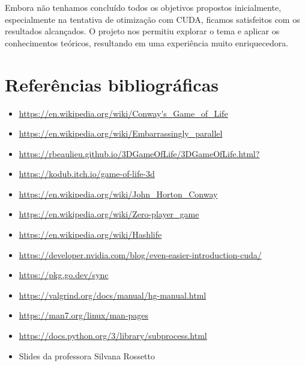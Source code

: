 \documentclass[14]{article}
\begin{document}
Embora não tenhamos concluído todos os objetivos propostos inicialmente, especialmente na tentativa de otimização com CUDA, ficamos satisfeitos com os resultados alcançados. O projeto nos permitiu explorar o tema e aplicar os conhecimentos teóricos, resultando em uma experiência muito enriquecedora.


\section{Referências bibliográficas}
   
    \begin{itemize}
        \item \url{https://en.wikipedia.org/wiki/Conway's_Game_of_Life}
        \item \url{https://en.wikipedia.org/wiki/Embarrassingly_parallel}
        \item \url{https://rbeaulieu.github.io/3DGameOfLife/3DGameOfLife.html?}
        \item \url{https://kodub.itch.io/game-of-life-3d}
        \item \url{https://en.wikipedia.org/wiki/John_Horton_Conway}
        \item \url{https://en.wikipedia.org/wiki/Zero-player_game}
        \item \url{https://en.wikipedia.org/wiki/Hashlife}
        \item \url{https://developer.nvidia.com/blog/even-easier-introduction-cuda/}
        \item \url{https://pkg.go.dev/sync}
        \item \url{https://valgrind.org/docs/manual/hg-manual.html}
        \item \url{https://man7.org/linux/man-pages}
        \item \url{https://docs.python.org/3/library/subprocess.html}
        \item Slides da professora Silvana Rossetto
    \end{itemize}


%
%

\end{document}
